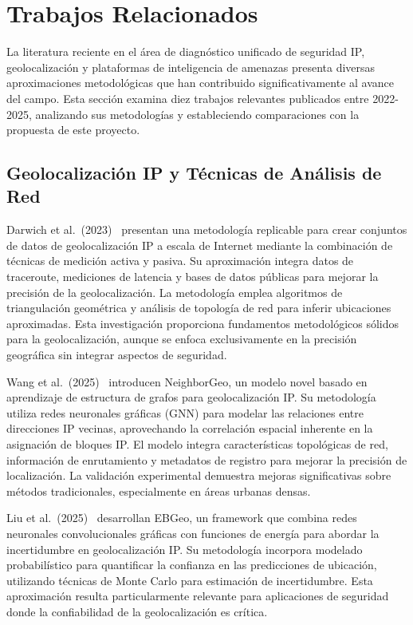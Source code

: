 \section{Trabajos Relacionados}

La literatura reciente en el área de diagnóstico unificado de seguridad IP, geolocalización y plataformas de inteligencia de amenazas presenta diversas aproximaciones metodológicas que han contribuido significativamente al avance del campo. Esta sección examina diez trabajos relevantes publicados entre 2022-2025, analizando sus metodologías y estableciendo comparaciones con la propuesta de este proyecto.

\subsection{Geolocalización IP y Técnicas de Análisis de Red}

Darwich et al.~(2023)~\cite{6} presentan una metodología replicable para crear conjuntos de datos de geolocalización IP a escala de Internet mediante la combinación de técnicas de medición activa y pasiva. Su aproximación integra datos de traceroute, mediciones de latencia y bases de datos públicas para mejorar la precisión de la geolocalización. La metodología emplea algoritmos de triangulación geométrica y análisis de topología de red para inferir ubicaciones aproximadas. Esta investigación proporciona fundamentos metodológicos sólidos para la geolocalización, aunque se enfoca exclusivamente en la precisión geográfica sin integrar aspectos de seguridad.

Wang et al.~(2025)~\cite{7} introducen NeighborGeo, un modelo novel basado en aprendizaje de estructura de grafos para geolocalización IP. Su metodología utiliza redes neuronales gráficas (GNN) para modelar las relaciones entre direcciones IP vecinas, aprovechando la correlación espacial inherente en la asignación de bloques IP. El modelo integra características topológicas de red, información de enrutamiento y metadatos de registro para mejorar la precisión de localización. La validación experimental demuestra mejoras significativas sobre métodos tradicionales, especialmente en áreas urbanas densas.

Liu et al.~(2025)~\cite{8} desarrollan EBGeo, un framework que combina redes neuronales convolucionales gráficas con funciones de energía para abordar la incertidumbre en geolocalización IP. Su metodología incorpora modelado probabilístico para quantificar la confianza en las predicciones de ubicación, utilizando técnicas de Monte Carlo para estimación de incertidumbre. Esta aproximación resulta particularmente relevante para aplicaciones de seguridad donde la confiabilidad de la geolocalización es crítica.

